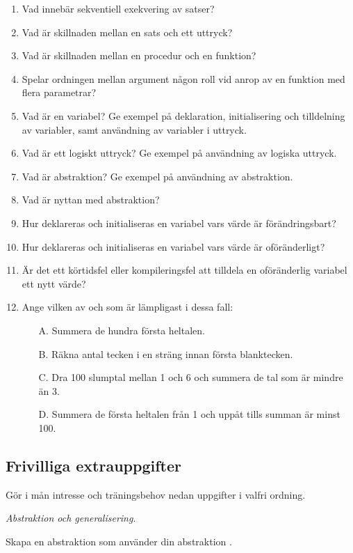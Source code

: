 \begin{enumerate}
\item Vad innebär sekventiell exekvering av satser?
\item Vad är skillnaden mellan en sats och ett uttryck?
\item Vad är skillnaden mellan en procedur och en funktion?
\item Spelar ordningen mellan argument någon roll vid anrop av en funktion med flera parametrar?
\item Vad är en variabel? Ge exempel på deklaration, initialisering och tilldelning av variabler, samt användning av variabler i uttryck.
\item Vad är ett logiskt uttryck? Ge exempel på användning av logiska uttryck.
\item Vad är abstraktion? Ge exempel på användning av abstraktion.
\item Vad är nyttan med abstraktion?
\item Hur deklareras och initialiseras en variabel vars värde är förändringsbart?
\item Hur deklareras och initialiseras en variabel vars värde är oföränderligt?
\item Är det ett körtidsfel eller kompileringsfel att tilldela en oföränderlig variabel ett nytt värde?
\item Ange vilken av  och  som är lämpligast i dessa fall:
\begin{itemize}[noitemsep, nolistsep]
\item[A.] Summera de hundra första heltalen.
\item[B.] Räkna antal tecken i en sträng innan första blanktecken.
\item[C.] Dra 100 slumptal mellan 1 och 6 och summera de tal som är mindre än 3.
\item[D.] Summera de första heltalen från 1 och uppåt tills summan är minst 100.
\end{itemize}
\end{enumerate}


\subsection{Frivilliga extrauppgifter}

\noindent Gör i mån intresse och träningsbehov nedan uppgifter i valfri ordning.

\Task \emph{Abstraktion och generalisering}.

\Subtask Skapa en abstraktion  som använder din abstraktion .

